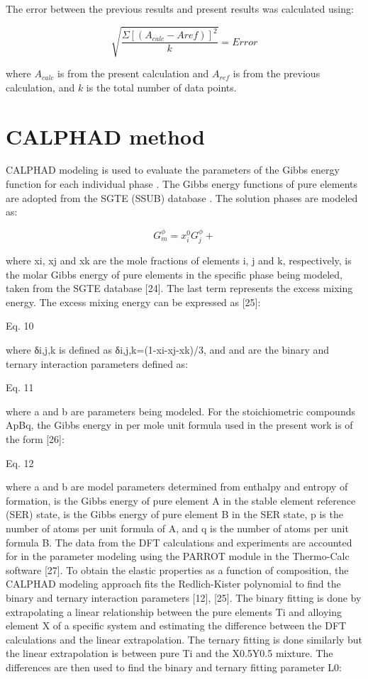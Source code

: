 The error between the previous results and present results was calculated using:

\begin{equation}
\label{eq: error}
\sqrt{\frac{\Sigma[(A_{calc}-A{ref})]^{2}}{k}} = Error
\end{equation}

where $A_{calc}$ is from the present calculation and $A_{ref}$ is from the previous calculation, and $k$ is the total number of data points. 

\section{CALPHAD method}

CALPHAD modeling is used to evaluate the parameters of the Gibbs energy function for each individual phase \cite{Liu2009}. The Gibbs energy functions of pure elements are adopted from the SGTE (SSUB) database \cite{Dinsdale1991}. The solution phases are modeled as: 

\begin{equation}
\label{eq: gibbssolution}
G_m^{\phi} = x_{i} ^{0}G_{j}^{\phi} + 
\end{equation}

where xi, xj and xk are the mole fractions of elements i, j and k, respectively,  is the molar Gibbs energy of pure elements in the specific phase being modeled, taken from the SGTE database [24].  The last term represents the excess mixing energy. The excess mixing energy can be expressed as [25]: 

Eq. 10

where δi,j,k is defined as δi,j,k=(1-xi-xj-xk)/3, and  and   are the binary and ternary interaction parameters defined as: 

Eq. 11

where a and b are parameters being modeled. 
For the stoichiometric compounds ApBq, the Gibbs energy in per mole unit formula used in the present work is of the form [26]: 

Eq. 12

where a and b are model parameters determined from enthalpy and entropy of formation,  is the Gibbs energy of pure element A in the stable element reference (SER) state,   is the Gibbs energy of pure element B in the SER state, p is the number of atoms per unit formula of A, and q is the number of atoms per unit formula B. The data from the DFT calculations and experiments are accounted for in the parameter modeling using the PARROT module in the Thermo-Calc software [27].
To obtain the elastic properties as a function of composition, the CALPHAD modeling approach fits the Redlich-Kister polynomial to find the binary and ternary interaction parameters [12], [25]. The binary fitting is done by extrapolating a linear relationship between the pure elements Ti and alloying element X of a specific system and estimating the difference between the DFT calculations and the linear extrapolation. The ternary fitting is done similarly but the linear extrapolation is between pure Ti and the X0.5Y0.5 mixture. The differences are then used to find the binary and ternary fitting parameter L0: 

